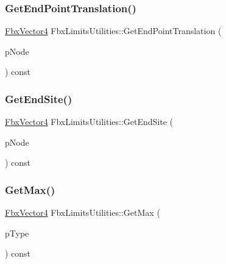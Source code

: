 \subsubsection{\texorpdfstring{Get\+End\+Point\+Translation()}{GetEndPointTranslation()}}
{\footnotesize\ttfamily \hyperlink{class_fbx_vector4}{Fbx\+Vector4} Fbx\+Limits\+Utilities\+::\+Get\+End\+Point\+Translation (\begin{DoxyParamCaption}\item[{\hyperlink{class_fbx_node}{Fbx\+Node} $\ast$}]{p\+Node }\end{DoxyParamCaption}) const}

\mbox{\label{class_fbx_limits_utilities_a0ec23f52b10360f82fd1670f984697dd}} 
\subsubsection{\texorpdfstring{Get\+End\+Site()}{GetEndSite()}}
{\footnotesize\ttfamily \hyperlink{class_fbx_vector4}{Fbx\+Vector4} Fbx\+Limits\+Utilities\+::\+Get\+End\+Site (\begin{DoxyParamCaption}\item[{\hyperlink{class_fbx_node}{Fbx\+Node} $\ast$}]{p\+Node }\end{DoxyParamCaption}) const}

\mbox{\label{class_fbx_limits_utilities_aa99f9ea9f9b1174d3971b63bc6a6e016}} 
\subsubsection{\texorpdfstring{Get\+Max()}{GetMax()}}
{\footnotesize\ttfamily \hyperlink{class_fbx_vector4}{Fbx\+Vector4} Fbx\+Limits\+Utilities\+::\+Get\+Max (\begin{DoxyParamCaption}\item[{\hyperlink{class_fbx_limits_utilities_aa55167751039b3d64b56cb7e58f2e62c}{E\+Type}}]{p\+Type }\end{DoxyParamCaption}) const}

\mbox{\label{class_fbx_limits_utilities_a17c96a6c202377bf7bea876d9c8a630b}} 
